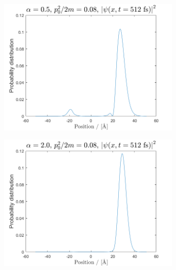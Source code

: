 \begin{figure}[H]

\centering
\begin{subfigure}[t]{0.47\textwidth}
	\includegraphics[width=\textwidth]{graphics/task3/a1e1.png}
	\caption{}
	\label{fig:3_a}
\end{subfigure}
\begin{subfigure}[t]{0.47\textwidth}
	\includegraphics[width=\textwidth]{graphics/task3/a2e1.png}
	\caption{}
	\label{fig:3_b}
\end{subfigure}


\end{figure}
